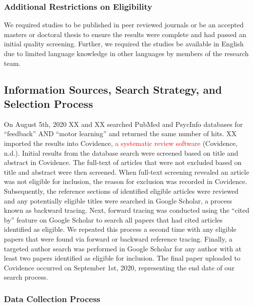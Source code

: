 \documentclass[
  english,
  man, donotrepeattitle,mask,floatsintext]{apa7}
\begin{document}
\hypertarget{additional-restrictions-on-eligibility}{%
\subsubsection{Additional Restrictions on Eligibility}\label{additional-restrictions-on-eligibility}}

We required studies to be published in peer reviewed journals or be an accepted masters or doctoral thesis to ensure the results were complete and had passed an initial quality screening. Further, we required the studies be available in English due to limited language knowledge in other languages by members of the research team.

\hypertarget{information-sources-search-strategy-and-selection-process}{%
\subsection{Information Sources, Search Strategy, and Selection Process}\label{information-sources-search-strategy-and-selection-process}}

On August 5th, 2020 XX and XX searched PubMed and PsycInfo databases for ``feedback'' AND ``motor learning'' and returned the same number of hits. XX imported the results into Covidence, \textcolor{red}{a systematic review software} (Covidence, n.d.). Initial results from the database search were screened based on title and abstract in Covidence. The full-text of articles that were not excluded based on title and abstract were then screened. When full-text screening revealed an article was not eligible for inclusion, the reason for exclusion was recorded in Covidence. Subsequently, the reference sections of identified eligible articles were reviewed and any potentially eligible titles were searched in Google Scholar, a process known as backward tracing. Next, forward tracing was conducted using the ``cited by'' feature on Google Scholar to search all papers that had cited articles identified as eligible. We repeated this process a second time with any eligible papers that were found via forward or backward reference tracing. Finally, a targeted author search was performed in Google Scholar for any author with at least two papers identified as eligible for inclusion. The final paper uploaded to Covidence occurred on September 1st, 2020, representing the end date of our search process.

\hypertarget{data-collection-process}{%
\subsubsection{Data Collection Process}\label{data-collection-process}}
\end{document}
